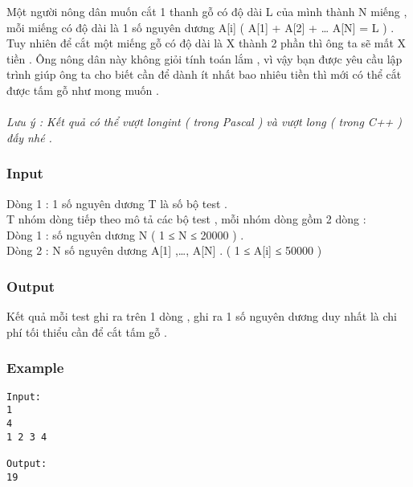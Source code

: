 



   Một người nông dân muốn cắt 1 thanh gỗ có độ dài L của mình thành N miếng , mỗi miếng có độ dài là 1 số nguyên dương A[i] ( A[1] + A[2] + … A[N] = L ) . Tuy nhiên để cắt một miếng gỗ có độ dài là X thành 2 phần thì ông ta sẽ mất X tiền . Ông nông dân này không giỏi tính toán lắm , vì vậy bạn được yêu cầu lập trình giúp ông ta cho biết cần để dành ít nhất bao nhiêu tiền thì mới có thể cắt được tấm gỗ như mong muốn .   
\\
\\\textit{    Lưu ý : Kết quả có thể vượt         longint        ( trong Pascal ) và vượt         long        ( trong C++ ) đấy nhé .   }

\subsubsection{   Input  }

   Dòng 1 : 1 số nguyên dương T là số bộ test .   
\\   T nhóm dòng tiếp theo mô tả các bộ test , mỗi nhóm dòng gồm 2 dòng :   
\\   Dòng 1 : số nguyên dương N  ( 1 ≤ N ≤ 20000 )  .   
\\   Dòng 2 : N số nguyên dương A[1] ,…, A[N] . ( 1 ≤ A[i] ≤ 50000 )   
\\

\subsubsection{   Output  }

   Kết quả mỗi test ghi ra trên 1 dòng , ghi ra 1 số nguyên dương duy nhất là chi phí tối thiểu cần để cắt tấm gỗ .  

\subsubsection{   Example  }
\begin{verbatim}
Input:
1
4
1 2 3 4

Output:
19
\end{verbatim}